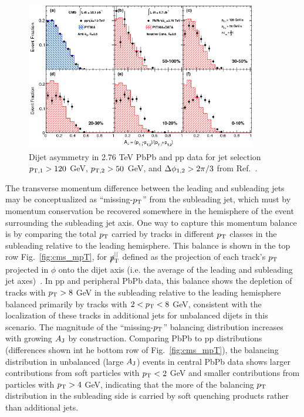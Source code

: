 \begin{figure}[hbtp]
\begin{center}
\includegraphics[width=0.9\textwidth]{figures/Theory/CMS_dijets.png}
\caption[Dijet asymmetry and in 2.76 TeV PbPb and pp data]{Dijet asymmetry in 2.76 TeV PbPb and pp data for jet selection $p_{\rm T,1} > 120$ GeV, $p_{\rm T,2} > 50$ GeV, and $\Delta\phi_{\rm 1,2} > 2\pi/3$ from Ref.~\cite{Chatrchyan:2011sx}.}
\label{fig:cms_dijets}
\end{center}
\end{figure}

The transverse momentum difference between the leading and subleading jets may be conceptualized as ``missing-$p_{\rm T}$'' from the subleading jet, which must by momentum conservation be recovered somewhere in the hemisphere of the event surrounding the subleading jet axis.  One way to capture this momentum balance is by comparing the total $p_{\rm T}$ carried by tracks in different $p_{\rm T}$ classes in the subleading relative to the leading hemisphere.  This balance is shown in the top row Fig.~\ref{fig:cms_mpT}, for $\slashed{p}_{\rm T}^{\rm ||}$ defined as the projection of each track's $p_{\rm T}$ projected in $\phi$ onto the dijet axis (i.e. the average of the leading and subleading jet axes)~\cite{HIN_2014_010}.  In pp and peripheral PbPb data, this balance shows the depletion of tracks with $p_{\rm T} > 8$ GeV in the subleading relative to the leading hemisphere balanced primarily by tracks with $2 < p_{\rm T} < 8$ GeV, consistent with the localization of these tracks in additional jets for unbalanced dijets in this scenario.  The magnitude of the ``missing-$p_{\rm T}$'' balancing distribution increases with growing $A_{\rm J}$ by construction.  Comparing PbPb to pp distributions (differences shown int he bottom row of Fig.~\ref{fig:cms_mpT}), the balancing distribution in unbalanced (large $A_{\rm J}$) events in central PbPb data shows larger contributions from soft particles with $p_{\rm T} < 2$ GeV and smaller contributions from particles with $p_{\rm T} > 4$ GeV, indicating that the more of the balancing $p_{\rm T}$ distribution in the subleading side is carried by soft quenching products rather than additional jets. 


